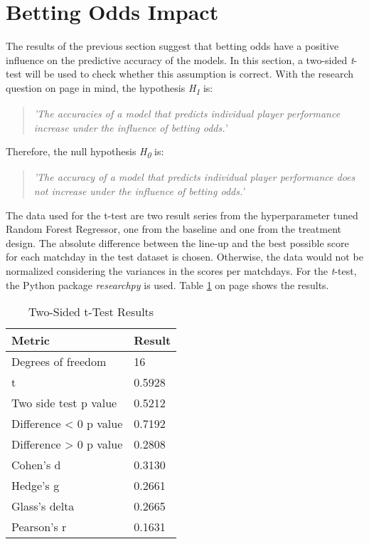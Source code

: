 \section{Betting Odds Impact}

The results of the previous section suggest that betting odds have a positive influence on the predictive accuracy of the models. In this section, a two-sided \emph{t}-test will be used to check whether this assumption is correct. With the research question on page \pageref{research_question} in mind, the hypothesis \emph{H\textsubscript{1}} is: 

\begin{quote}
    \centering
    \emph{'The accuracies of a model that predicts individual player performance increase under the influence of betting odds.'}
\end{quote}

Therefore, the null hypothesis \emph{H\textsubscript{0}} is:

\begin{quote}
    \centering
    \emph{'The accuracy of a model that predicts individual player performance does not increase under the influence of betting odds.'}
\end{quote}

The data used for the t-test are two result series from the hyperparameter tuned Random Forest Regressor, one from the baseline and one from the treatment design. The absolute difference between the line-up and the best possible score for each matchday in the test dataset is chosen. Otherwise, the data would not be normalized considering the variances in the scores per matchdays. For the \emph{t}-test, the Python package \emph{researchpy} is used. Table \ref{tab:t-test} on page \pageref{tab:t-test} shows the results. 

\begin{table}[H]
    \centering
    \captionsetup{justification=centering}
    \caption{Two-Sided t-Test Results}
    \renewcommand{\arraystretch}{1.25}
    \setlength{\tabcolsep}{10pt}
    \label{tab:t-test}
    \begin{tabular}{@{}ll@{}}
    \toprule
    \textbf{Metric} & \textbf{Result} \\ \midrule
    Degrees of freedom      & 16 \\
    t                       & 0.5928 \\
    Two side test p value   & 0.5212 \\
    Difference < 0 p value  & 0.7192 \\
    Difference > 0 p value  & 0.2808 \\
    Cohen's d               & 0.3130 \\
    Hedge's g               & 0.2661 \\
    Glass's delta           & 0.2665 \\
    Pearson's r             & 0.1631 \\ \bottomrule
    \end{tabular}
\end{table}

